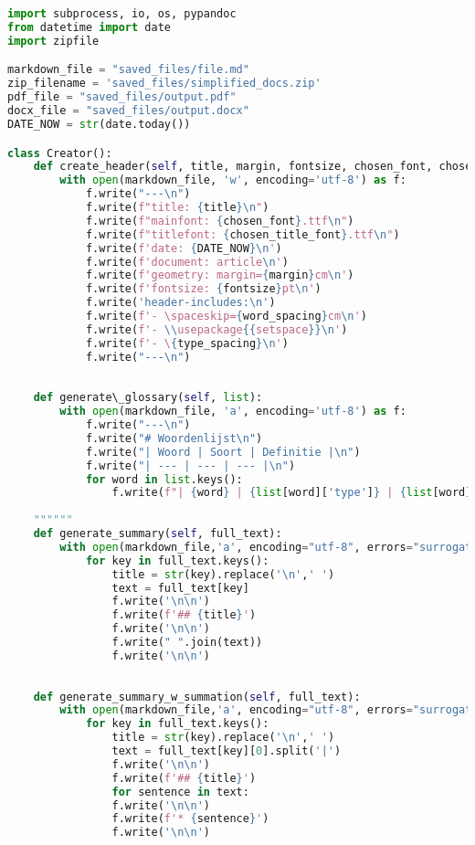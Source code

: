 \chapter{}%
\label{ch:bijlage-code-2}

\begin{lstlisting}[language=Python, caption={Writer-klasse omvattende de code om dynamische PDF- en Word-documenten te genereren.}, label={code:writer-klasse}]
import subprocess, io, os, pypandoc
from datetime import date
import zipfile

markdown_file = "saved_files/file.md"
zip_filename = 'saved_files/simplified_docs.zip'
pdf_file = "saved_files/output.pdf"
docx_file = "saved_files/output.docx"
DATE_NOW = str(date.today())

class Creator():
	def create_header(self, title, margin, fontsize, chosen_font, chosen_title_font, word_spacing, type_spacing):
		with open(markdown_file, 'w', encoding='utf-8') as f:
			f.write("---\n")
			f.write(f"title: {title}\n") 
			f.write(f"mainfont: {chosen_font}.ttf\n")
			f.write(f"titlefont: {chosen_title_font}.ttf\n")
			f.write(f'date: {DATE_NOW}\n')
			f.write(f'document: article\n')
			f.write(f'geometry: margin={margin}cm\n')
			f.write(f'fontsize: {fontsize}pt\n')
			f.write('header-includes:\n')
			f.write(f'- \spaceskip={word_spacing}cm\n')
			f.write(f'- \\usepackage{{setspace}}\n')
			f.write(f'- \{type_spacing}\n')
			f.write("---\n")
	
	
	def generate\_glossary(self, list):
		with open(markdown_file, 'a', encoding='utf-8') as f:
			f.write("---\n")
			f.write("# Woordenlijst\n")
			f.write("| Woord | Soort | Definitie |\n")
			f.write("| --- | --- | --- |\n")
			for word in list.keys(): 
				f.write(f"| {word} | {list[word]['type']} | {list[word]['definition']} |\n")
	
	""""""
	def generate_summary(self, full_text):
		with open(markdown_file,'a', encoding="utf-8", errors="surrogateescape") as f:
			for key in full_text.keys():
				title = str(key).replace('\n',' ')
				text = full_text[key]
				f.write('\n\n')
				f.write(f'## {title}')
				f.write('\n\n')
				f.write(" ".join(text))
				f.write('\n\n')
	
	
	def generate_summary_w_summation(self, full_text):
		with open(markdown_file,'a', encoding="utf-8", errors="surrogateescape") as f:
			for key in full_text.keys():
				title = str(key).replace('\n',' ')
				text = full_text[key][0].split('|')
				f.write('\n\n')
				f.write(f'## {title}')
				for sentence in text:    
				f.write('\n\n')
				f.write(f'* {sentence}')
				f.write('\n\n')
	

\end{lstlisting}

